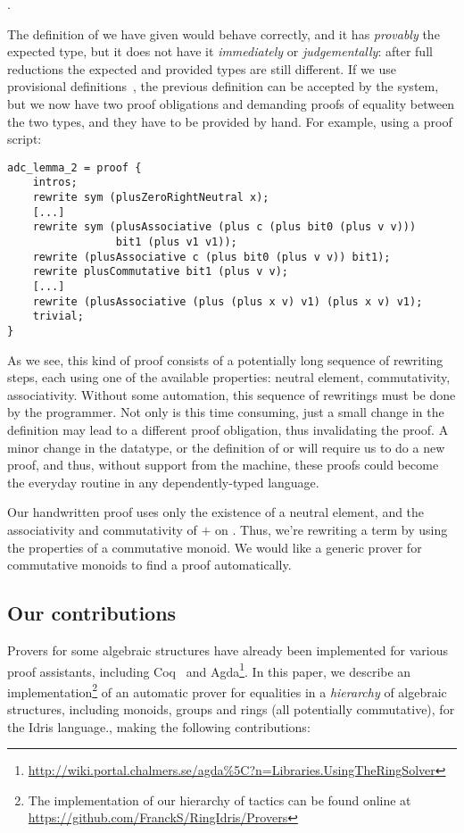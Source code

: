 .

The definition of  we have given would behave correctly, and it has
\emph{provably} the expected type, but it does not have it \emph{immediately}
or \emph{judgementally}: after full reductions the expected and provided types are still
different.
If we use provisional definitions~\cite{DBLP:conf/plpv/Brady13}, the previous
definition can be accepted by the system, but we now have two proof obligations
 and  demanding proofs of equality
between the two types, and they have to be provided by hand.
For example, using a proof script: 

\begin{lstlisting}
adc_lemma_2 = proof {
    intros;
    rewrite sym (plusZeroRightNeutral x);
    [...]
    rewrite sym (plusAssociative (plus c (plus bit0 (plus v v))) 
                 bit1 (plus v1 v1));
    rewrite (plusAssociative c (plus bit0 (plus v v)) bit1);
    rewrite plusCommutative bit1 (plus v v);
    [...]
    rewrite (plusAssociative (plus (plus x v) v1) (plus x v) v1);
    trivial;
}
\end{lstlisting}

As we see, this kind of proof consists of a potentially long sequence of
rewriting steps, each using one of the available properties: neutral element,
commutativity, associativity. Without some automation, this sequence of
rewritings must be done by the programmer.  Not only is this time consuming,
just a small change in the definition may lead to a different proof obligation,
thus invalidating the proof. 
A minor change in the datatype, or 
the definition of  or  will require us
to do a new proof, and thus, without support from the machine, these
proofs
could become the everyday routine in any dependently-typed language.

Our handwritten proof uses only the existence of a neutral
element, and the associativity and commutativity of $+$ on . Thus,
we're rewriting a term by using the properties of a commutative monoid. We
would like a generic prover for commutative monoids to find a proof 
automatically.

\subsection{Our contributions}

Provers for some algebraic structures have already been implemented for various
proof assistants, including Coq~\cite{Coq2005} and
Agda\footnote{\url{http://wiki.portal.chalmers.se/agda\%5C?n=Libraries.UsingTheRingSolver}}. 
In this paper, we describe an implementation\footnote{The
implementation of our hierarchy of tactics can be found online at
\url{https://github.com/FranckS/RingIdris/Provers}} of an automatic prover for
equalities in a \emph{hierarchy} of algebraic structures, including monoids,
groups and rings (all potentially commutative), for the Idris language.,
making the following contributions:

